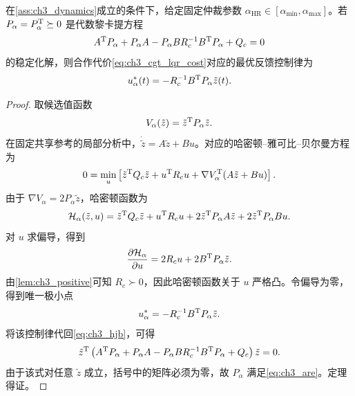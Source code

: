 \begin{theorem}[固定仲裁参数下的最优共享控制律]
\label{thm:ch3_lqr}
在\cref{ass:ch3_dynamics}成立的条件下，给定固定仲裁参数 $\alpha_{\mathrm{HR}}\in[\alpha_{\min},\alpha_{\max}]$。若 $P_\alpha=P_\alpha^{\mathrm{T}}\succeq0$ 是代数黎卡提方程
\begin{equation}
  A^{\mathrm{T}}P_\alpha+P_\alpha A-P_\alpha BR_c^{-1}B^{\mathrm{T}}P_\alpha+Q_c=0
  \label{eq:ch3_are}
\end{equation}
的稳定化解，则合作代价\eqref{eq:ch3_cgt_lqr_cost}对应的最优反馈控制律为
\begin{equation}
  u_\alpha^*(t)=-R_c^{-1}B^{\mathrm{T}}P_\alpha\tilde z(t) .
  \label{eq:ch3_u_star}
\end{equation}
\end{theorem}

\begin{proof}
取候选值函数
\begin{equation}
  V_\alpha(\tilde z)=\tilde z^{\mathrm{T}}P_\alpha\tilde z .
\end{equation}
在固定共享参考的局部分析中，$\dot{\tilde z}=A\tilde z+Bu$。对应的哈密顿--雅可比--贝尔曼方程为
\begin{equation}
  0=\min_u\left[\tilde z^{\mathrm{T}}Q_c\tilde z+u^{\mathrm{T}}R_c u+\nabla V_\alpha^{\mathrm{T}}(A\tilde z+Bu)\right].
  \label{eq:ch3_hjb}
\end{equation}
由于 $\nabla V_\alpha=2P_\alpha\tilde z$，哈密顿函数为
\begin{equation}
  \mathcal{H}_\alpha(\tilde z,u)=\tilde z^{\mathrm{T}}Q_c\tilde z+u^{\mathrm{T}}R_cu+2\tilde z^{\mathrm{T}}P_\alpha A\tilde z+2\tilde z^{\mathrm{T}}P_\alpha Bu .
\end{equation}
对 $u$ 求偏导，得到
\begin{equation}
  \frac{\partial \mathcal{H}_\alpha}{\partial u}=2R_cu+2B^{\mathrm{T}}P_\alpha\tilde z .
\end{equation}
由\cref{lem:ch3_positive}可知 $R_c\succ0$，因此哈密顿函数关于 $u$ 严格凸。令偏导为零，得到唯一极小点
\begin{equation}
  u_\alpha^*=-R_c^{-1}B^{\mathrm{T}}P_\alpha\tilde z .
\end{equation}
将该控制律代回\eqref{eq:ch3_hjb}，可得
\begin{equation}
  \tilde z^{\mathrm{T}}\left(A^{\mathrm{T}}P_\alpha+P_\alpha A-P_\alpha BR_c^{-1}B^{\mathrm{T}}P_\alpha+Q_c\right)\tilde z=0 .
\end{equation}
由于该式对任意 $\tilde z$ 成立，括号中的矩阵必须为零，故 $P_\alpha$ 满足\eqref{eq:ch3_are}。定理得证。
\end{proof}

